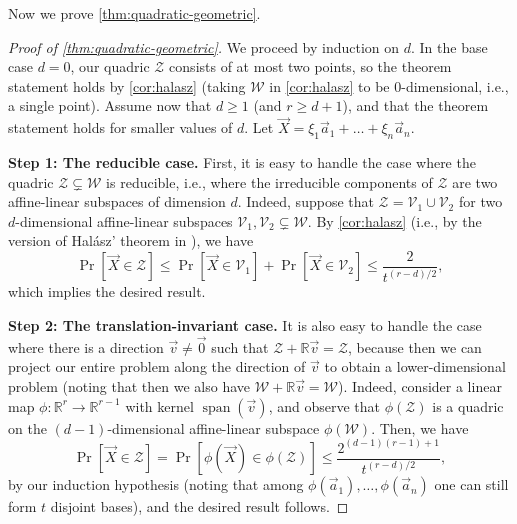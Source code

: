 \documentclass[english]{article}
\theoremstyle{remark}
\numberwithin{equation}{section}
\numberwithin{figure}{section}
\newcommand{\RR}{\mathbb{R}}
\newcommand{\on}{\operatorname}
\begin{document}
Now we prove \cref{thm:quadratic-geometric}.

\begin{proof}[Proof of \cref{thm:quadratic-geometric}]
We proceed by induction on $d$. In the base case $d=0$, our quadric
$\mathcal{Z}$ consists of at most two points, so the theorem statement holds by \cref{cor:halasz} (taking  $\mathcal{W}$ in \cref{cor:halasz} to be $0$-dimensional, i.e., a single point). Assume now
that $d\ge1$ (and $r\ge d+1$), and that the theorem statement holds
for smaller values of $d$. Let $\vec{X}=\xi_{1}\vec{a}_{1}+\dots+\xi_{n}\vec{a}_{n}$. 

\textbf{Step 1: The reducible case.} First, it is easy to handle the case where the quadric $\mathcal{Z}\subsetneq \mathcal{W}$ is reducible, i.e., where the irreducible components of $\mathcal{Z}$ are two affine-linear subspaces of dimension $d$. Indeed, suppose
that $\mathcal{Z}=\mathcal{V}_{1}\cup\mathcal{V}_{2}$ for two $d$-dimensional
affine-linear subspaces $\mathcal{V}_{1},\mathcal{V}_{2}\subsetneq\mathcal{W}$.
By \cref{cor:halasz} (i.e., by the version of Hal\'asz' theorem in \cite{FJZ22}), we have
\[
\Pr[\vec{X}\in\mathcal{Z}]\le\Pr[\vec{X}\in\mathcal{V}_{1}]+\Pr[\vec{X}\in\mathcal{V}_{2}]\le \frac{2}{t^{(r-d)/2}},
\]
which implies the desired result.

\textbf{Step 2: The translation-invariant case.} It is also easy to handle the case where there is a direction $\vec{v}\ne\vec 0$
such that $\mathcal{Z}+\mathbb{R}\vec{v}=\mathcal{Z}$, because then
we can project our entire problem along the direction of $\vec{v}$ to obtain a lower-dimensional problem (noting that then we also have $\mathcal{W}+\mathbb{R}\vec{v}=\mathcal{W}$). Indeed,
consider a linear map $\phi:\RR^r\to \RR^{r-1}$ with kernel $\on{span}(\vec v)$, and observe that  $\phi(\mathcal{Z})$
is a quadric on the $(d-1)$-dimensional affine-linear subspace $\phi(\mathcal{W})$. 
Then,
we have 
\[
\Pr[\vec{X}\in\mathcal{Z}]=\Pr[\phi(\vec{X})\in\phi(\mathcal{Z})]\le\frac{2^{(d-1)(r-1)+1}}{t^{(r-d)/2}},
\]
by our induction hypothesis (noting that among $\phi(\vec{a}_1),\dots, \phi(\vec{a}_n)$ one can still form $t$ disjoint bases), and the desired result follows.


\end{proof}
\end{document}

